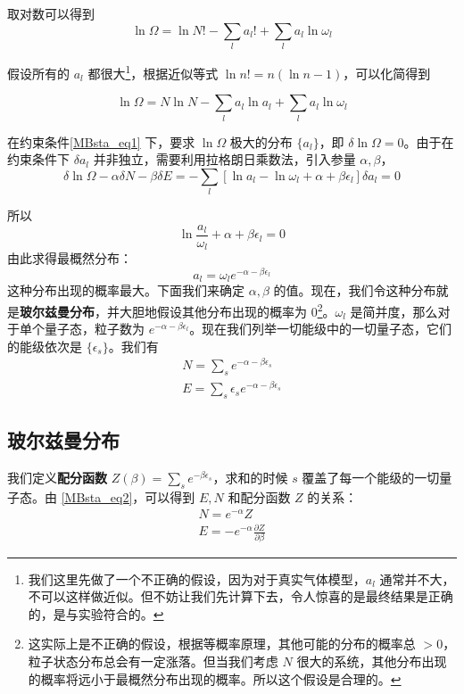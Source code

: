 取对数可以得到
\begin{equation}
\ln \Omega=\ln N!-\sum_{l}a_l!+\sum_l a_l\ln \omega_l
\end{equation}

假设所有的 $a_l$ 都很大\footnote{我们这里先做了一个不正确的假设，因为对于真实气体模型，$a_l$ 通常并不大，不可以这样做近似。但不妨让我们先计算下去，令人惊喜的是最终结果是正确的，是与实验符合的。}，根据近似等式 $\ln n! = n(\ln n-1)$，可以化简得到

\begin{equation}\label{MBsta_eq6}
\ln \Omega=N\ln N-\sum_l a_l\ln a_l+\sum_l a_l\ln \omega_l
\end{equation}

在约束条件\autoref{MBsta_eq1} 下，要求 $\ln \Omega$ 极大的分布 $\{a_l\}$，即 $\delta \ln \Omega =0$。由于在约束条件下 $\delta a_l$ 并非独立，需要利用拉格朗日乘数法，引入参量 $\alpha,\beta$，
\begin{equation}\label{MBsta_eq7}
\delta \ln \Omega -\alpha \delta N-\beta \delta E=-\sum_l [\ln a_l-\ln \omega_l+\alpha +\beta\epsilon_l]\delta a_l=0
\end{equation}

所以
\begin{equation}
\ln \frac{a_l}{\omega_l}+\alpha+\beta\epsilon_l = 0
\end{equation}
由此求得最概然分布：
\begin{equation}\label{MBsta_eq5}
a_l=\omega_l e^{-\alpha -\beta \epsilon_l}
\end{equation}
这种分布出现的概率最大。下面我们来确定 $\alpha,\beta$ 的值。现在，我们令这种分布就是\textbf{玻尔兹曼分布}，并大胆地假设其他分布出现的概率为 $0$\footnote{这实际上是不正确的假设，根据等概率原理，其他可能的分布的概率总 $>0$，粒子状态分布总会有一定涨落。但当我们考虑 $N$ 很大的系统，其他分布出现的概率将远小于最概然分布出现的概率。所以这个假设是合理的。}。$\omega_l$ 是简并度，那么对于单个量子态，粒子数为 $e^{-\alpha-\beta \epsilon_l}$。现在我们列举一切能级中的一切量子态，它们的能级依次是 $\{\epsilon_s\}$。我们有
\begin{equation}\label{MBsta_eq2}
\begin{aligned}
N=\sum_s e^{-\alpha-\beta \epsilon_s}\\
E=\sum_s \epsilon_s e^{-\alpha-\beta \epsilon_s}
\end{aligned}
\end{equation}
\subsection{玻尔兹曼分布}
我们定义\textbf{配分函数} $Z(\beta)=\sum_s e^{-\beta \epsilon_s}$，求和的时候 $s$ 覆盖了每一个能级的一切量子态。由 \autoref{MBsta_eq2}，可以得到 $E,N$ 和配分函数 $Z$ 的关系：
\begin{equation}\label{MBsta_eq3}
\begin{aligned}
N=e^{-\alpha}Z\\
E=-e^{-\alpha}\frac{\partial Z}{\partial \beta}
\end{aligned}
\end{equation}

